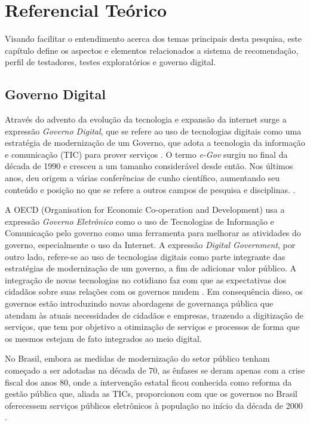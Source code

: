 \chapter[Referencial Teórico]{Referencial Teórico}
Visando facilitar o entendimento acerca dos temas principais desta pesquisa, este capítulo define os aspectos e elementos relacionados a sistema de
recomendação, perfil de testadores, testes exploratórios e governo digital.
\section{Governo Digital}

Através do advento da evolução da tecnologia e expansão da internet surge a expressão \textit{Governo Digital},
que se refere ao uso de tecnologias digitais como uma estratégia de modernização de um Governo, que adota a tecnologia
da informação e comunicação (TIC) para prover serviços \cite{fang2002government}. O termo \textit{e-Gov} surgiu no final da década de 1990 e cresceu a um tamanho considerável desde então. Nos últimos
anos, deu origem a várias conferências de cunho científico, aumentando seu conteúdo e posição no que se refere a outros
campos de pesquisa e disciplinas. \cite{gronlund2005introducing}.

A OECD (Organisation for Economic Co-operation and Development) usa a expressão \textit {Governo Eletrônico} como o uso de Tecnologias de Informação e
Comunicação pelo governo como uma ferramenta para melhorar as atividades do governo, especialmente o uso da Internet. A expressão
\textit{Digital Government}, por outro lado, refere-se ao uso de tecnologias digitais como parte integrante das estratégias de modernização de um governo,
a fim de adicionar valor público. A integração de novas tecnologias no cotidiano faz com que as expectativas dos cidadãos sobre suas relações com os governos
mudem \cite{oecd}. Em consequência disso, os governos estão introduzindo novas abordagens de governança pública que atendam às atuais necessidades de
cidadãos e empresas, trazendo a digitização de serviços, que tem por objetivo a otimização de serviços e processos de forma que os mesmos estejam de fato
integrados ao meio digital.

No Brasil, embora as medidas de modernização do setor público tenham começado a ser adotadas na década de 70, as ênfases se deram apenas com a crise fiscal
dos anos 80, onde a intervenção estatal ficou conhecida como reforma da gestão pública que, aliada as TICs, proporcionou com que os governos no Brasil oferecessem
serviços públicos eletrônicos à população no início da década de 2000 \cite{przeybilovicz2015desenvolvimento}.

